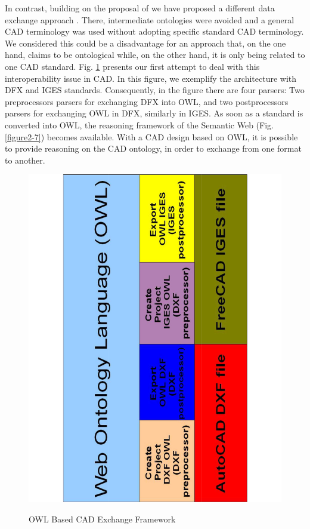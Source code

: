 In contrast, building on the proposal of \cite{abdul-ghafour_common_2007}  we  have proposed a different data exchange approach \citep{ramos_ontological_2010}. There, intermediate ontologies were avoided and a general CAD terminology was used without adopting specific standard CAD terminology. We considered this could be a disadvantage for an approach that, on the one hand, claims to be ontological while, on the other hand, it is only being related to one CAD standard. Fig. \ref{figure4-30} presents our first attempt to deal with this interoperability issue in CAD.  In this figure, we exemplify the architecture with DFX and IGES standards. Consequently, in the figure  there are four parsers: \cpstart Two preprocessors parsers for exchanging DFX into OWL, and two postprocessors parsers for exchanging OWL in DFX, similarly in IGES\cpend. As soon as a standard is converted into OWL, the reasoning framework of the Semantic Web (Fig. \ref{figure2-7}) becomes available. With a CAD design based on OWL, it is possible to provide reasoning on the CAD ontology, in order to exchange from one format to another. 


\begin{figure}
\begin{center}
	\includegraphics[scale=0.5, angle=270]{figure-chapterIV/fig4-30}\\
	\caption{OWL Based CAD   Exchange Framework}
	\label{figure4-30}
\end{center}
\end{figure}

